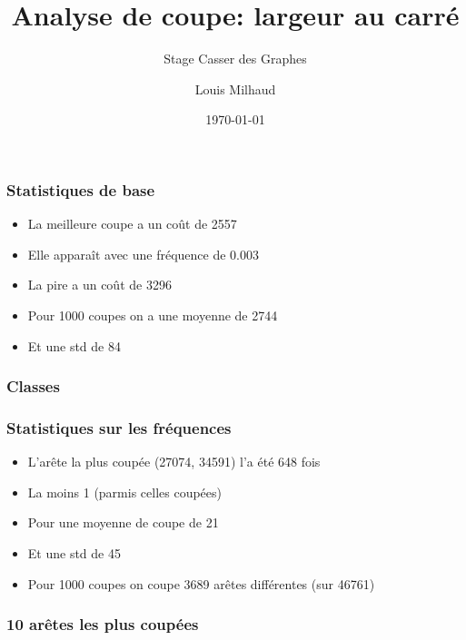 \documentclass[aspectratio=169]{beamer}
\title{Analyse de coupe: largeur au carré}
\subtitle{Stage Casser des Graphes}
\author{Louis Milhaud}
\institute{Complex Networks - LIP6}
\date{\today}
\begin{document}
    \begin{frame}
        \titlepage
    \end{frame}

    \begin{frame}
        \frametitle{Statistiques de base}

        \begin{itemize}
            \item La meilleure coupe a un coût de 2557
            \item Elle apparaît avec une fréquence de 0.003
            \item La pire a un coût de 3296
            \item Pour 1000 coupes on a une moyenne de 2744
            \item Et une std de 84
        \end{itemize}
    
    \end{frame}

    \begin{frame}
        \frametitle{Classes}
    
        
    
    \end{frame}

    \begin{frame}
        \frametitle{Statistiques sur les fréquences}
        
        \begin{itemize}
            \item L'arête la plus coupée (27074, 34591) l'a été 648 fois
            \item La moins 1 (parmis celles coupées)
            \item Pour une moyenne de coupe de 21
            \item Et une std de 45
            \item Pour 1000 coupes on coupe 3689 arêtes différentes (sur 46761)
        \end{itemize}
    
    \end{frame}

    \begin{frame}
        \frametitle{10 arêtes les plus coupées}
    
        
    
    \end{frame}
\end{document}
